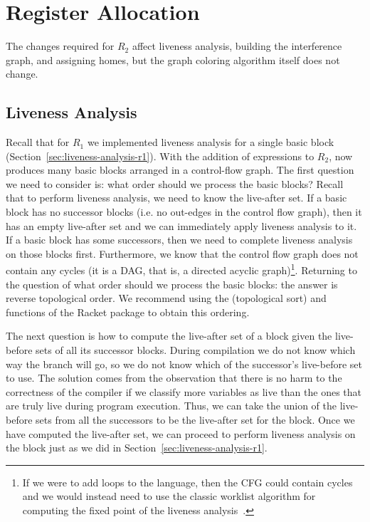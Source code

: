 \documentclass[11pt]{book}
\begin{document}
\section{Register Allocation}
\label{sec:register-allocation-r2}

The changes required for $R_2$ affect liveness analysis, building the
interference graph, and assigning homes, but the graph coloring
algorithm itself does not change.

\subsection{Liveness Analysis}
\label{sec:liveness-analysis-r2}

Recall that for $R_1$ we implemented liveness analysis for a single
basic block (Section~\ref{sec:liveness-analysis-r1}). With the
addition of  expressions to $R_2$, 
now produces many basic blocks arranged in a control-flow graph. The
first question we need to consider is: what order should we process
the basic blocks? Recall that to perform liveness analysis, we need to
know the live-after set. If a basic block has no successor blocks
(i.e. no out-edges in the control flow graph), then it has an empty
live-after set and we can immediately apply liveness analysis to
it. If a basic block has some successors, then we need to complete
liveness analysis on those blocks first.  Furthermore, we know that
the control flow graph does not contain any cycles (it is a DAG, that
is, a directed acyclic graph)\footnote{If we were to add loops to the
  language, then the CFG could contain cycles and we would instead
  need to use the classic worklist algorithm for computing the fixed
  point of the liveness analysis~\citep{Aho:1986qf}.}.  Returning to
the question of what order should we process the basic blocks: the
answer is reverse topological order. We recommend using the
 (topological sort) and  functions of the
Racket  package to obtain this ordering.

The next question is how to compute the live-after set of a block
given the live-before sets of all its successor blocks.  During
compilation we do not know which way the branch will go, so we do not
know which of the successor's live-before set to use.  The solution
comes from the observation that there is no harm to the correctness of
the compiler if we classify more variables as live than the ones that
are truly live during program execution. Thus, we can take the union
of the live-before sets from all the successors to be the live-after
set for the block. Once we have computed the live-after set, we can
proceed to perform liveness analysis on the block just as we did in
Section~\ref{sec:liveness-analysis-r1}.
\end{document}
